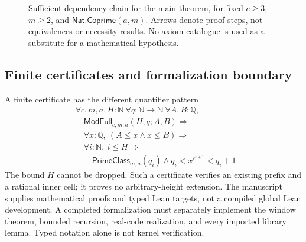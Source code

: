 \documentclass[11pt,reqno]{amsart}
\newcommand{\N}{\mathbb N}
\newcommand{\Q}{\mathbb Q}
\newcommand{\R}{\mathbb R}
\theoremstyle{blueplain}
\newcounter{type}
\numberwithin{equation}{section}
\begin{document}
\begin{figure}[H]
\centering
{}
\caption{Sufficient dependency chain for the main theorem, for fixed
$c\ge3$, $m\ge2$, and $\textsf{Nat.Coprime}(a,m)$.
Arrows denote proof steps, not equivalences or necessity results.
No axiom catalogue is used as a substitute for a mathematical hypothesis.}
\label{fig:typed-main-dependencies}
\end{figure}

\subsection{Finite certificates and formalization boundary}
A finite certificate has the different quantifier pattern
\[
\begin{aligned}
&\forall c,m,a,H:\N\ \forall q:\N\to\N\ \forall A,B:\Q,\\
&\quad\textsf{ModFull}_{c,m,a}(H,q;A,B)\Rightarrow\\
&\quad\forall x:\Q,\ (A\le x\wedge x\le B)\Rightarrow\\
&\quad\forall i:\N,\ i\le H\Rightarrow\\
&\qquad\textsf{PrimeClass}_{m,a}(q_i)\wedge q_i<x^{c^{i+1}}<q_i+1.
\end{aligned}
\]
The bound $H$ cannot be dropped. Such a certificate verifies an existing
prefix and a rational inner cell; it proves no arbitrary-height extension.
The manuscript supplies mathematical proofs and typed Lean targets, not a
compiled global Lean development. A completed formalization must separately
implement the window theorem, bounded recursion, real-code realization,
and every imported library lemma. Typed notation alone is not kernel verification.
\end{document}
